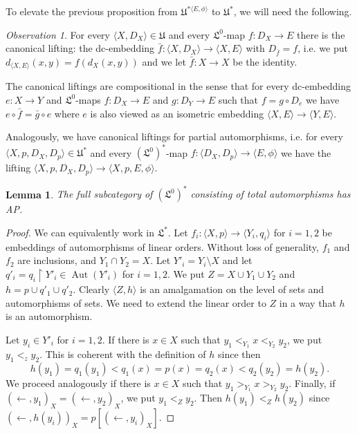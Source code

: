 \documentclass[10pt,a4paper]{article}
\newtheorem{lm}[tw]{Lemma}
\theoremstyle{definition}
\theoremstyle{remark}
\newtheorem{observation}[tw]{Observation}
\newcommand \seq [1]{\langle #1 \rangle}
\newcommand \maps {\colon} %
\newcommand \im [1]{[#1]} %
\newcommand \from {\leftarrow}
\newcommand \cmp {\circ} %
\newcommand \Lin {\mathfrak{L}}
\newcommand \Ult {\mathfrak{U}}
\newcommand \Aut {\operatorname{Aut}}
\let \aut \Aut
\begin{document}
To elevate the previous proposition from $\Ult^{*\seq{E, \phi}}$ to $\Ult^*$, we will need the following.

\begin{observation} \label{obs:liftings}
    For every $\seq{X, D_X} \in \Ult$ and every $\Lin^0$-map $f\maps D_X \to E$ there is the canonical lifting: the dc-embedding $\bar{f}\maps \seq{X, D_X} \to \seq{X, E}$ with $D_{\bar{f}} = f$, i.e. we put $d_{\seq{X, E}}(x, y) = f(d_X(x, y))$ and we let $\bar{f}\maps X \to X$ be the identity.
    
    The canonical liftings are compositional in the sense that for every dc-embedding $e\maps X \to Y$ and $\Lin^0$-maps $f\maps D_X \to E$ and $g\maps D_Y \to E$ such that $f = g \cmp D_e$ we have $e \cmp \bar{f} = \bar{g} \cmp e$ where $e$ is also viewed as an isometric embedding $\seq{X, E} \to \seq{Y, E}$.
    
    Analogously, we have canonical liftings for partial automorphisms, i.e. for every $\seq{X, p, D_X, D_p} \in \Ult^*$ and every $(\Lin^0)^*$-map $f\maps \seq{D_X, D_p} \to \seq{E, \phi}$ we have the lifting $\seq{X, p, D_X, D_p} \to \seq{X, p, E, \phi}$.
\end{observation}

\begin{lm} \label{thm:order_auto_amalagamation}
    The full subcategory of $(\Lin^0)^*$ consisting of total automorphisms has AP.
\end{lm}
\begin{proof}
    We can equivalently work in $\Lin^*$.
    Let $f_i\maps \seq{X, p} \to \seq{Y_i, q_i}$ for $i = 1, 2$ be embeddings of automorphisms of linear orders.
    Without loss of generality, $f_1$ and $f_2$ are inclusions, and $Y_1 \cap Y_2 = X$.
    Let $Y'_i = Y_i \setminus X$ and let $q'_i=q_i\restriction Y'_i \in \aut(Y'_i)$ for $i = 1, 2$.
    We put $Z = X \cup Y_1 \cup Y_2$ and $h = p \cup q'_1 \cup q'_2$.
    Clearly $\seq{Z, h}$ is an amalgamation on the level of sets and automorphisms of sets.
    We need to extend the linear order to $Z$ in a way that $h$ is an automorphism.

    Let $y_i \in Y'_i$ for $i = 1, 2$.
    If there is $x \in X$ such that $y_1 <_{Y_1} x <_{Y_2} y_2$, we put $y_1 <_z y_2$.
    This is coherent with the definition of $h$ since then
    \[
        h(y_1) = q_1(y_1) < q_1(x) = p(x) = q_2(x) < q_2(y_2) = h(y_2).
    \]
    We proceed analogously if there is $x \in X$ such that $y_1 >_{Y_1} x >_{Y_2} y_2$.
    Finally, if $(\from, y_1)_X = (\from, y_2)_X$, we put $y_1 <_Z y_2$.
    Then $h(y_1) <_Z h(y_2)$ since $(\from, h(y_i))_X = p\im{(\from, y_i)_X}$.
\end{proof}
\end{document}
